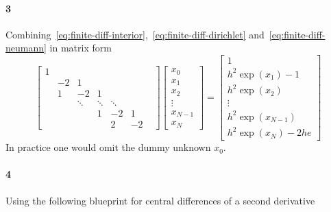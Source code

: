 \documentclass[a4paper]{article}
\begin{document}
  \paragraph{3} Combining~\eqref{eq:finite-diff-interior},~\eqref{eq:finite-diff-dirichlet} and~\eqref{eq:finite-diff-neumann} in matrix form
  \begin{equation*}
    \begin{bmatrix}
      1 \\
      & -2 & 1 &   &   &    \\
      &1 & -2 & 1 &   &    \\
      & & \ddots & \ddots & \ddots \\
      &  & & 1 & -2 & 1 &    \\
      & & & & 2 & -2
    \end{bmatrix}
    \begin{bmatrix}
      x_0 \\ x_1 \\ x_2 \\ \vdots \\ x_{N - 1} \\ x_N
    \end{bmatrix}
    =
    \begin{bmatrix}
      1 \\ h^2 \exp(x_1) - 1 \\ h^2 \exp(x_2) \\ \vdots \\ h^2 \exp(x_{N - 1}) \\ h^2 \exp(x_N) - 2he
    \end{bmatrix}
  \end{equation*}
  In practice one would omit the dummy unknown $x_0.$

  \paragraph{4} Using the following blueprint for central differences of a second derivative

  \lstset{basicstyle=\footnotesize\ttfamily,breaklines=true,style=myCustomMatlabStyle}
\end{document}
